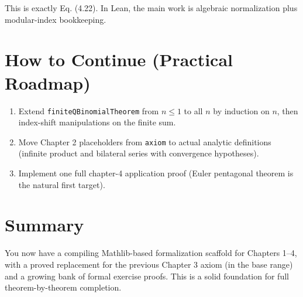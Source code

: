 \documentclass[11pt]{article}
\begin{document}
This is exactly Eq. (4.22). In Lean, the main work is algebraic normalization plus modular-index bookkeeping.

\section{How to Continue (Practical Roadmap)}
\begin{enumerate}[leftmargin=1.4em]
  \item Extend \texttt{finiteQBinomialTheorem} from \(n \le 1\) to all \(n\) by induction on \(n\), then index-shift manipulations on the finite sum.
  \item Move Chapter 2 placeholders from \texttt{axiom} to actual analytic definitions (infinite product and bilateral series with convergence hypotheses).
  \item Implement one full chapter-4 application proof (Euler pentagonal theorem is the natural first target).
\end{enumerate}

\section{Summary}
You now have a compiling Mathlib-based formalization scaffold for Chapters 1--4, with a proved replacement for the previous Chapter 3 axiom (in the base range) and a growing bank of formal exercise proofs. This is a solid foundation for full theorem-by-theorem completion.
\end{document}

